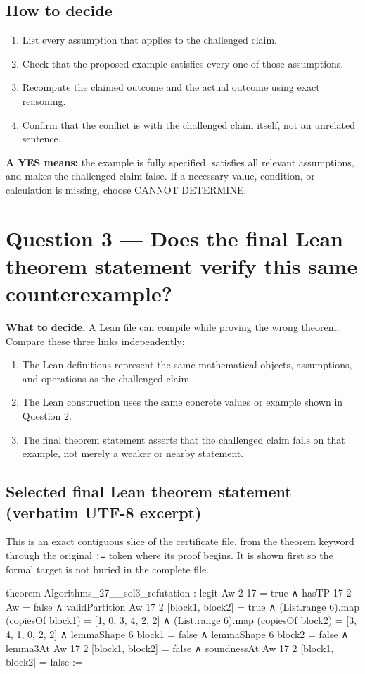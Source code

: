 \documentclass[11pt]{article}
\begin{document}
\subsection*{How to decide}
\begin{enumerate}
\item List every assumption that applies to the challenged claim.
\item Check that the proposed example satisfies every one of those assumptions.
\item Recompute the claimed outcome and the actual outcome using exact reasoning.
\item Confirm that the conflict is with the challenged claim itself, not an unrelated sentence.
\end{enumerate}
\textbf{A YES means:} the example is fully specified, satisfies all relevant assumptions, and makes the challenged claim false. If a necessary value, condition, or calculation is missing, choose CANNOT DETERMINE.
\section*{Question 3 --- Does the final Lean theorem statement verify this same counterexample?}
\textbf{What to decide.} A Lean file can compile while proving the wrong theorem. Compare these three links independently:
\begin{enumerate}
\item The Lean definitions represent the same mathematical objects, assumptions, and operations as the challenged claim.
\item The Lean construction uses the same concrete values or example shown in Question 2.
\item The final theorem statement asserts that the challenged claim fails on that example, not merely a weaker or nearby statement.
\end{enumerate}
\subsection*{Selected final Lean theorem statement (verbatim UTF-8 excerpt)}
This is an exact contiguous slice of the certificate file, from the theorem keyword through the original \texttt{:=} token where its proof begins. It is shown first so the formal target is not buried in the complete file.
\begin{Vlean}
theorem Algorithms_27__sol3_refutation :
    legit Aw 2 17 = true
  ∧ hasTP 17 2 Aw = false
  ∧ validPartition Aw 17 2 [block1, block2] = true
  ∧ (List.range 6).map (copiesOf block1) = [1, 0, 3, 4, 2, 2]
  ∧ (List.range 6).map (copiesOf block2) = [3, 4, 1, 0, 2, 2]
  ∧ lemmaShape 6 block1 = false
  ∧ lemmaShape 6 block2 = false
  ∧ lemma3At Aw 17 2 [block1, block2] = false
  ∧ soundnessAt Aw 17 2 [block1, block2] = false :=
\end{Vlean}
\end{document}
